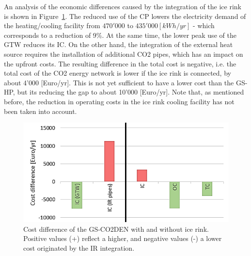 \documentclass{article}
\begin{document}
An analysis of the economic differences caused by the integration of the ice rink is shown in Figure~\ref{fig:V_IR_cost}. The reduced use of the CP lowers the electricity demand of the heating/cooling facility from $470'000$ to $435'000 [kWh/yr]$ - which corresponds to a reduction of 9\%. At the same time, the lower peak use of the GTW reduces its IC. On the other hand, the integration of the external heat source requires the installation of additional CO2 pipes, which has an impact on the upfront costs. The resulting difference in the total cost is negative, i.e. the total cost of the CO2 energy network is lower if the ice rink is connected, by about 4'000 [Euro/yr]. This is not yet sufficient to have a lower cost than the GS-HP, but its reducing the gap to about 10'000 [Euro/yr]. Note that, as mentioned before, the reduction in operating costs in the ice rink cooling facility has not been taken into account.\\

%

\begin{figure}[tph]
	\centering
	\includegraphics[width=0.7\linewidth]{Images/V_IR_cost}
	\caption{Cost difference of the GS-CO2DEN with and without ice rink. Positive values (+) reflect a higher, and negative values (-) a lower cost originated by the IR integration.}
	\label{fig:V_IR_cost}
\end{figure}
\end{document}
